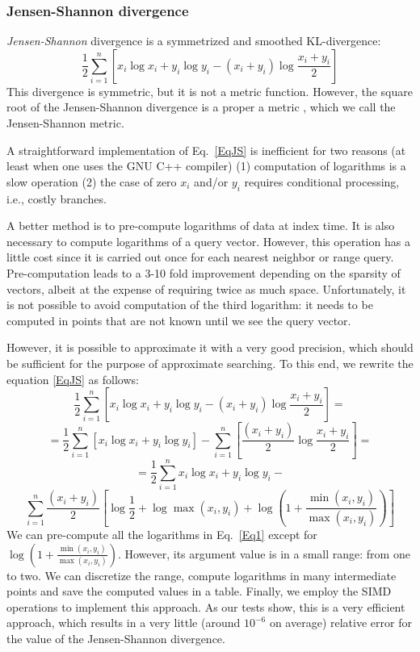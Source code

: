 \documentclass[runningheads,a4paper]{llncs}
\begin{document}
{\subsubsection{Jensen-Shannon divergence}\label{SectionJS}
\emph{Jensen-Shannon} divergence is a symmetrized and smoothed KL-divergence:
\begin{equation}\label{EqJS}
\frac{1}{2}\sum_{i=1}^n\left[ x_i \log x_i + y_i \log y_i  -(x_i+y_i)\log \frac{x_i +y_i}{2}\right]
\end{equation}
This divergence is symmetric, but it is not a metric function.
However, the square root of the Jensen-Shannon divergence
is a proper a metric \cite{endres2003new},
which we call the Jensen-Shannon metric.

A straightforward implementation of Eq.~\ref{EqJS} is inefficient for two reasons 
(at least when one uses the GNU C++ compiler)
(1) computation of logarithms is a slow operation (2)
the case of zero $x_i$ and/or $y_i$ requires conditional processing, i.e.,
costly branches.

A better method is to pre-compute logarithms of data at index time. 
It is also necessary to compute logarithms of a query vector.
However, this operation has a little cost since it is carried out once 
for each nearest neighbor or range query.
Pre-computation leads to a 3-10 fold improvement depending on the sparsity of vectors,
albeit at the expense of requiring twice as much space.
Unfortunately, it is not possible to avoid computation of the third logarithm:
it needs to be computed in points that are not known until we see the query vector.

However, it is possible to approximate it with a very good precision,
which should be sufficient for the purpose of approximate searching.
To this end, we rewrite the equation \ref{EqJS} as follows:
$$
\frac{1}{2}\sum_{i=1}^n\left[ x_i \log x_i + y_i \log y_i  -(x_i+y_i)\log \frac{x_i +y_i}{2}\right]=
$$
$$
 = \frac{1}{2}\sum_{i=1}^n\left[ x_i \log x_i + y_i \log y_i\right]  -
\sum_{i=1}^n\left[\frac{(x_i+y_i)}{2}\log \frac{x_i +y_i}{2} \right]=
$$
$$
 = \frac{1}{2}\sum_{i=1}^n x_i \log x_i + y_i \log y_i  -
$$
\begin{equation}\label{Eq1}
\sum_{i=1}^n\frac{(x_i+y_i)}{2}\left[\log\frac{1}{2} + \log \max(x_i,y_i) + 
\log \left(1 + \frac{\min(x_i,y_i)}{\max(x_i,y_i)}\right) \right]
\end{equation}
We can pre-compute all the logarithms in Eq.~\ref{Eq1} except for $\log \left(1 + \frac{\min(x_i,y_i)}{\max(x_i,y_i)}\right) $. However, its argument value is in a small range: from one to two.
We can discretize the range, compute logarithms in many intermediate points and save the computed values in a table.
Finally, we employ the SIMD operations to implement this approach. 
As our tests show, this is a very efficient approach, which results in a very little (around $10^{-6}$ on average) relative error for the value of the Jensen-Shannon divergence.

}
\end{document}
